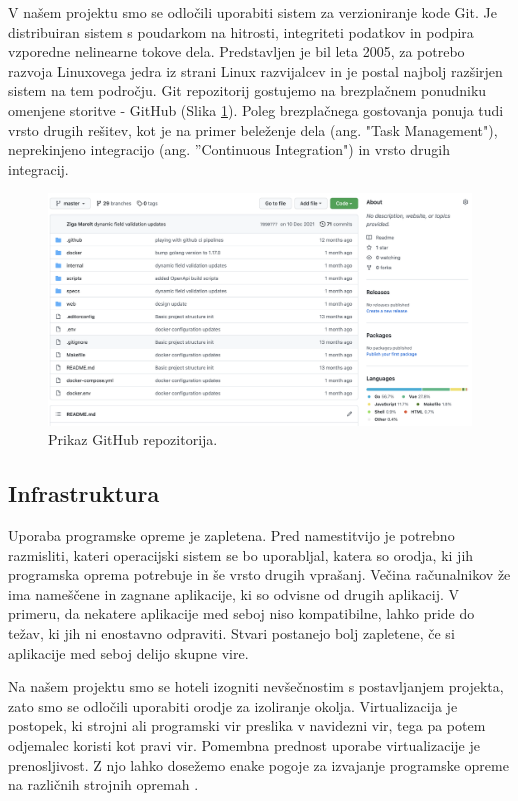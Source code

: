 \documentclass[a4paper, 12pt]{book}
\begin{document}
V našem projektu smo se odločili uporabiti sistem za verzioniranje kode Git. Je distribuiran sistem s poudarkom na hitrosti, integriteti podatkov in podpira vzporedne nelinearne tokove dela. Predstavljen je bil leta 2005, za potrebo razvoja Linuxovega jedra iz strani Linux razvijalcev \cite{git-history} in je postal najbolj razširjen sistem na tem področju. Git repozitorij gostujemo na brezplačnem ponudniku omenjene storitve - GitHub (Slika \ref{github-project}). Poleg brezplačnega gostovanja ponuja tudi vrsto drugih rešitev, kot je na primer beleženje dela (ang. "Task Management"), neprekinjeno integracijo (ang. ''Continuous Integration") in vrsto drugih integracij.

\begin{figure}[h]
\begin{center}
\includegraphics[width=1\textwidth]{slike/github.png}
\end{center}
\caption{ Prikaz GitHub repozitorija. }
\label{github-project}
\end{figure}

\subsection{Infrastruktura}
Uporaba programske opreme je zapletena. Pred namestitvijo je potrebno razmisliti, kateri operacijski sistem se bo uporabljal, katera so orodja, ki jih programska oprema potrebuje in še vrsto drugih vprašanj. Večina računalnikov že ima nameščene in zagnane aplikacije, ki so odvisne od drugih aplikacij. V primeru, da nekatere aplikacije med seboj niso kompatibilne, lahko pride do težav, ki jih ni enostavno odpraviti. Stvari postanejo bolj zapletene, če si aplikacije med seboj delijo skupne vire.

Na našem projektu smo se hoteli izogniti nevšečnostim s postavljanjem projekta, zato smo se odločili uporabiti orodje za izoliranje okolja. Virtualizacija je postopek, ki strojni ali programski vir preslika v navidezni vir, tega pa potem odjemalec koristi kot pravi vir. Pomembna prednost uporabe virtualizacije je prenosljivost. Z njo lahko dosežemo enake pogoje za izvajanje programske opreme na različnih strojnih opremah \cite{docker-in-action}.
\end{document}
